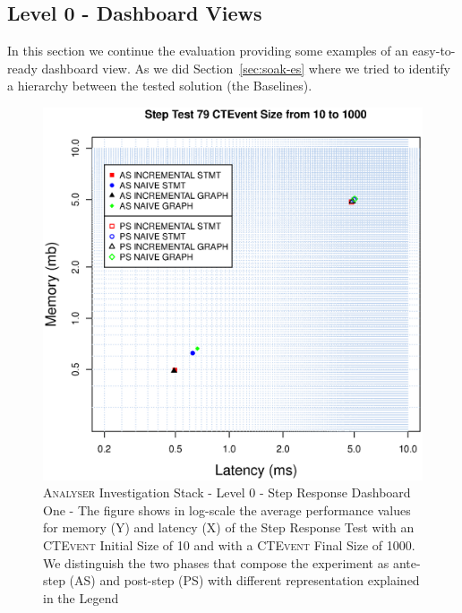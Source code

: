 \subsection{Level 0 - Dashboard Views}\label{sec:level0-step-dashboard}

In this section we continue the evaluation providing some examples of an easy-to-ready dashboard view. As we did Section~\ref{sec:soak-es} where we tried to identify a hierarchy between the tested solution (the Baselines). 

\begin{figure}[htbp]
	\centering
	\includegraphics[width=\linewidth]{images/level-0-step-dashboard-1}	
	\caption[\textsc{Analyser} Investigation Stack - Level 0 - Step Response Dashboard One]{\textsc{Analyser} Investigation Stack - Level 0 - Step Response Dashboard One - The figure shows in log-scale the average performance values for memory (Y) and latency (X) of the Step Response Test with an \textsc{CTEvent} Initial Size of 10 and with a \textsc{CTEvent} Final Size of 1000. We distinguish the two phases that compose the experiment as ante-step (AS) and post-step (PS) with different representation explained in the Legend}
	\label{fig:level-0-step-dashboard-1}
\end{figure}
